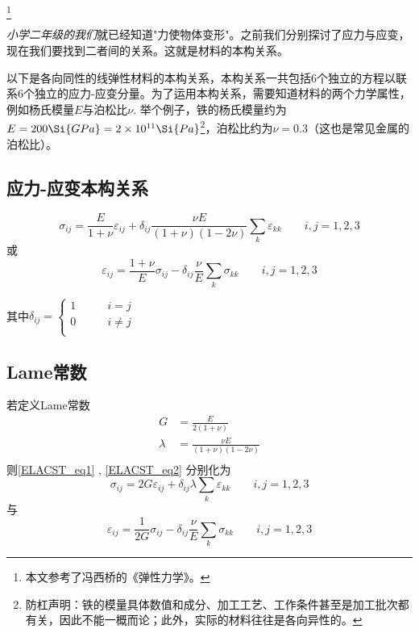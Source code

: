 
\begin{issues}
\issueDraft
\end{issues}
\footnote{本文参考了冯西桥的《弹性力学》。}

\textsl{小学二年级的我们}就已经知道"力使物体变形"。之前我们分别探讨了应力与应变，现在我们要找到二者间的关系。这就是材料的本构关系。

以下是各向同性的线弹性材料的本构关系，本构关系一共包括$6$个独立的方程以联系$6$个独立的应力-应变分量。为了运用本构关系，需要知道材料的两个力学属性，例如杨氏模量$E$与泊松比$\nu$. 举个例子，铁的杨氏模量约为$E = 200 \Si{GPa} = 2 \times 10^{11} \Si{Pa}$\footnote{防杠声明：铁的模量具体数值和成分、加工工艺、工作条件甚至是加工批次都有关，因此不能一概而论；此外，实际的材料往往是各向异性的。}，泊松比约为$\nu=0.3$（这也是常见金属的泊松比）。

\subsection{应力-应变本构关系}
\begin{equation}\label{ELACST_eq1}
\sigma_{ij}=\frac{E}{1+\nu}\varepsilon_{ij}+\delta_{ij}\frac{\nu E}{(1+\nu)(1-2\nu)}\sum_k\varepsilon_{kk}\qquad i,j=1,2,3
\end{equation}
或
\begin{equation}\label{ELACST_eq2}
\varepsilon_{ij}=\frac{1+\nu}{E}\sigma_{ij}-\delta_{ij}\frac{\nu}{E}\sum_k\sigma_{kk} \qquad i,j=1,2,3
\end{equation}

其中$\delta_{ij} = \left \{
\begin{aligned}
1 &\qquad i = j\\
0 &\qquad i \ne j\\
\end{aligned}
\right.
$

\subsection{Lame常数}
若定义Lame常数
\begin{equation}
\begin{aligned}
G&=\frac{E}{2(1+\nu)}\\
\lambda &= \frac{\nu E}{(1+\nu)(1-2\nu)}\\
\end{aligned}
\end{equation}
则\autoref{ELACST_eq1} , \autoref{ELACST_eq2} 分别化为
\begin{equation}
\sigma_{ij}=2G\varepsilon_{ij}+\delta_{ij}\lambda\sum_k\varepsilon_{kk}\qquad i,j=1,2,3
\end{equation}
与
\begin{equation}
\varepsilon_{ij}=\frac{1}{2G}\sigma_{ij}-\delta_{ij}\frac{\nu}{E}\sum_k\sigma_{kk} \qquad i,j=1,2,3
\end{equation}

